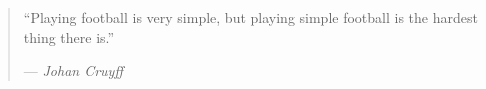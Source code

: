 %
\cleardoublepage
\thispagestyle{empty}

\begin{quote}
\noindent``Playing football is very simple, but playing simple football is the hardest thing there is.''
	
--- \emph{Johan Cruyff}
\end{quote}

\clearemptydoublepage